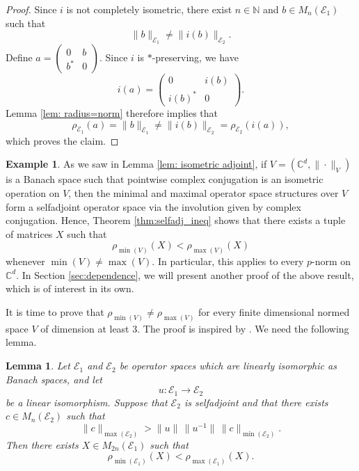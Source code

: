 \documentclass[12pt]{amsart}
\numberwithin{equation}{section}
\newtheorem{lemma}[theorem]{Lemma}
\theoremstyle{definition}
\newtheorem{example}[theorem]{Example}
\newcommand{\cE}{\mathcal{E}}
\begin{document}
\begin{proof}
    Since $i$ is not completely isometric, there exist $n\in\mathbb N$ and $b\in M_n(\cE_1)$ such that
    \[
      \|b\|_{\cE_1}\neq\|i(b)\|_{\cE_2}.
    \]
    Define $a=\begin{pmatrix} 0 & b\\ b^* & 0\end{pmatrix}$. Since $i$ is $*$-preserving, we have
      \[
        i(a)=\begin{pmatrix} 0 & i(b)\\ i(b)^* & 0\end{pmatrix}.
      \]
    Lemma \ref{lem: radius=norm} therefore implies that
      \[
        \rho_{\cE_1}(a)=\|b\|_{\cE_1}\neq\|i(b)\|_{\cE_2}=\rho_{\cE_2}(i(a)),
      \]
    which proves the claim.
\end{proof}


\begin{example}
    As we saw in Lemma \ref{lem: isometric adjoint}, if $V=(\mathbb{C}^d,\|\cdot\|_V)$ is a Banach space such that pointwise complex conjugation is an isometric operation on $V$, then the minimal and maximal operator space structures over $V$ form a selfadjoint operator space via the involution given by complex conjugation. Hence, Theorem \ref{thm:selfadj_ineq} shows that there exists a tuple of matrices $X$ such that
      \[
        \rho_{\min(V)}(X)<\rho_{\max(V)}(X)
      \]
    whenever $\min(V)\neq\max(V)$. In particular, this applies to every $p$-norm on $\mathbb{C}^d$.
    In Section \ref{sec:dependence}, we will present another proof of the above result, which is of interest in its own.
\end{example}

It is time to prove that $\rho_{\min(V)}\neq\rho_{\max(V)}$ for every finite dimensional normed space $V$ of dimension at least $3$. The proof is inspired by \cite{paulsen1992representations}. We need the following lemma.

\begin{lemma}\label{lem: radii linear isomorphism}
    Let $\cE_1$ and $\cE_2$ be operator spaces which are linearly isomorphic as Banach spaces, and let
  \[
    u:\cE_1\to \cE_2
  \]
be a linear isomorphism. Suppose that $\cE_2$ is selfadjoint and that there exists
$c\in M_n(\cE_2)$ such that
  \[
    \|c\|_{\max(\cE_2)}
    >
    \|u\|\,\|u^{-1}\|\,
    \|c\|_{\min(\cE_2)}.
  \]
Then there exists $X\in M_{2n}(\cE_1)$ such that
  \[
    \rho_{\min(\cE_1)}(X)<\rho_{\max(\cE_1)}(X).
  \]
\end{lemma}
\end{document}
